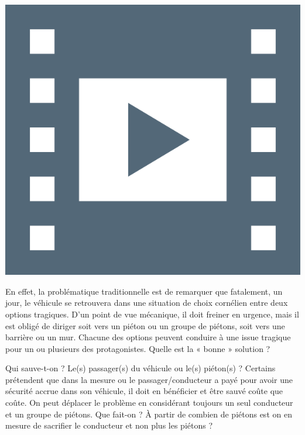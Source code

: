 \begin{marginvideo}
	[\label{vid:III.4}Éthique et robotique.]%
	\href{https://www.youtube.com/watch?v=9-zEJdpyBzs}%
	  {\includegraphics[width=\marginparwidth]{./Images/Pictograms/film-strip-dark-electric-blue.png}}%
\end{marginvideo}

En effet, la problématique traditionnelle est de remarquer que fatalement, un jour, le véhicule se retrouvera dans une situation de choix cornélien entre deux options tragiques. D'un point de vue mécanique, il doit freiner en urgence, mais il est obligé de diriger soit vers un piéton ou un groupe de piétons, soit vers une barrière ou un mur. Chacune des options peuvent conduire à une issue tragique pour un ou plusieurs des protagonistes. Quelle est la « bonne » solution ?

Qui sauve-t-on ? Le(s) passager(s) du véhicule ou le(s) piéton(s) ? Certains prétendent que dans la mesure ou le passager/conducteur a payé pour avoir une sécurité accrue dans son véhicule, il doit en bénéficier et être sauvé coûte que coûte. On peut déplacer le problème en considérant toujours un seul conducteur et un groupe de piétons. Que fait-on ? À partir de combien de piétons est on en mesure de sacrifier le conducteur et non plus les piétons ? 

